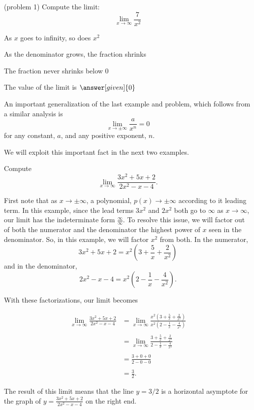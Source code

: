 \documentclass{ximera}
\begin{document}
\begin{problem}(problem 1)
  Compute the limit:
  \[
  \lim_{x \to \infty} \frac{7}{x^2}
  \]
  
    \begin{hint}
      As $x$ goes to infinity, so does $x^2$
    \end{hint}
    \begin{hint}
      As the denominator grows, the fraction shrinks
    \end{hint}
    \begin{hint}
      The fraction never shrinks below 0
    \end{hint}
		The value of the limit is
		 $\answer[given]{0}$
		
\end{problem}

An important generalization of the last example and problem, which follows from a similar analysis is 
\[\lim_{x \to \pm \infty} \frac{a}{x^n} = 0 \]
for any constant, $a$, and any positive exponent, $n$.

We will exploit this important fact in the next two examples.


\begin{example}[example 2]
Compute 
\[
\lim_{x \to \infty} \frac{3x^2 + 5x + 2}{2x^2 -x- 4}.
\]

First note that as $x\to \pm \infty$, a polynomial, $p(x) \to \pm \infty$ according to it leading term.
In this example, since the lead terms $3x^2$ and $2x^2$ both go to $\infty$ as $x \to \infty$, 
our limit has the indeterminate form
$\frac{\infty}{\infty}$.
To resolve this issue, we will factor out of both the numerator and the denominator 
the highest power of $x$ seen in the denominator.  So, in this example, we will factor $x^2$ from both.
In the numerator, 
\[3x^2 + 5x + 2 = x^2(3 + \frac{5}{x} + \frac{2}{x^2})\]
and in the denominator,
\[2x^2 -x -4 = x^2(2- \frac{1}{x} - \frac{4}{x^2}).\]

With these factorizations, our limit becomes

\begin{align*}
\lim_{x \to \infty} \frac{3x^2 + 5x + 2}{2x^2 -x- 4} &= 
\lim_{x \to \infty} \frac{x^2(3 + \frac{5}{x} + \frac{2}{x^2})}{x^2(2- \frac{1}{x} - \frac{4}{x^2})} \\ \\
&=\lim_{x \to \infty} \frac{3 + \frac{5}{x} + \frac{2}{x^2}}{2- \frac{1}{x} - \frac{4}{x^2}} \\ \\
&=\frac{3 + 0 + 0}{2- 0 - 0} \\ \\
&= \frac32.
\end{align*}

The result of this limit means that the line $y = 3/2$ is a horizontal asymptote
for the graph of $y = \frac{3x^2 + 5x + 2}{2x^2 -x- 4}$ on the right end.
\end{example}
\end{document}
